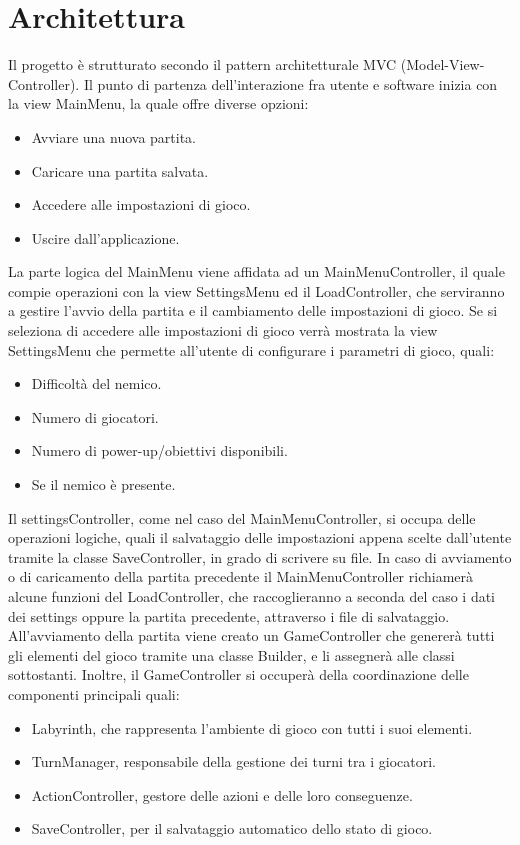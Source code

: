 \documentclass[a4paper,12pt]{report}
\begin{document}
\section{Architettura}
Il progetto è strutturato secondo il pattern architetturale MVC (Model-View-Controller). 
Il punto di partenza dell’interazione fra utente e software inizia con la view MainMenu, la quale offre diverse opzioni:
\begin{itemize}
	\item Avviare una nuova partita.
	\item Caricare una partita salvata.
	\item Accedere alle impostazioni di gioco.
	\item Uscire dall’applicazione.
\end{itemize}
La parte logica del MainMenu viene affidata ad un MainMenuController, 
il quale compie operazioni con la view SettingsMenu ed il LoadController, che serviranno a gestire l’avvio della partita e il cambiamento delle impostazioni di gioco.
Se si seleziona di accedere alle impostazioni di gioco verrà mostrata la view SettingsMenu che permette all’utente di configurare i parametri di gioco, quali:
\begin{itemize}
	\item Difficoltà del nemico.
	\item Numero di giocatori.
	\item Numero di power-up/obiettivi disponibili.
	\item Se il nemico è presente.
\end{itemize}
Il settingsController, come nel caso del MainMenuController, si occupa delle operazioni logiche, 
quali il salvataggio delle impostazioni appena scelte dall’utente tramite la classe  SaveController, in grado di scrivere su file.
In caso di avviamento o di caricamento della partita precedente il MainMenuController richiamerà alcune funzioni del 
LoadController, che raccoglieranno a seconda del caso i dati dei settings oppure la partita precedente, attraverso i file di salvataggio.
All’avviamento della partita viene creato un GameController che genererà tutti gli elementi del gioco tramite una classe Builder, 
e li assegnerà alle classi sottostanti. Inoltre, il GameController si occuperà della coordinazione delle componenti principali quali:
\begin{itemize}
	\item Labyrinth, che rappresenta l’ambiente di gioco con tutti i suoi elementi.
	\item TurnManager, responsabile della gestione dei turni tra i giocatori.
	\item ActionController, gestore delle azioni e delle loro conseguenze.
	\item SaveController, per il salvataggio automatico dello stato di gioco.
\end{itemize}
\end{document}
